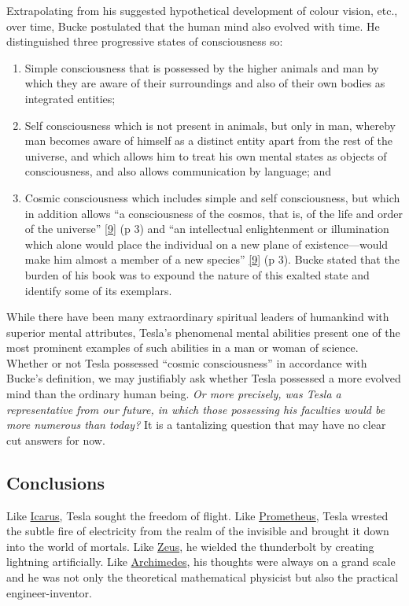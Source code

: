 \documentclass[
  a4paper,
]{article}
\begin{document}
Extrapolating from his suggested hypothetical development of colour
vision, etc., over time, Bucke postulated that the human mind also
evolved with time. He distinguished three progressive states of
consciousness so:

\begin{enumerate}
\item
  Simple consciousness that is possessed by the higher animals and man
  by which they are aware of their surroundings and also of their own
  bodies as integrated entities;
\item
  Self consciousness which is not present in animals, but only in man,
  whereby man becomes aware of himself as a distinct entity apart from
  the rest of the universe, and which allows him to treat his own mental
  states as objects of consciousness, and also allows communication by
  language; and
\item
  Cosmic consciousness which includes simple and self consciousness, but
  which in addition allows ``a consciousness of the cosmos, that is, of
  the life and order of the universe''
  \protect\hyperlink{ref-bucke48}{{[}9{]}} (p 3) and ``an intellectual
  enlightenment or illumination which alone would place the individual
  on a new plane of existence---would make him almost a member of a new
  species'' \protect\hyperlink{ref-bucke48}{{[}9{]}} (p 3). Bucke stated
  that the burden of his book was to expound the nature of this exalted
  state and identify some of its exemplars.
\end{enumerate}

While there have been many extraordinary spiritual leaders of humankind
with superior mental attributes, Tesla's phenomenal mental abilities
present one of the most prominent examples of such abilities in a man or
woman of science. Whether or not Tesla possessed ``cosmic
consciousness'' in accordance with Bucke's definition, we may
justifiably ask whether Tesla possessed a more evolved mind than the
ordinary human being. \emph{Or more precisely, was Tesla a
representative from our future, in which those possessing his faculties
would be more numerous than today?} It is a tantalizing question that
may have no clear cut answers for now.

\hypertarget{conclusions}{%
\subsection{Conclusions}\label{conclusions}}

Like \href{https://en.wikipedia.org/wiki/Icarus}{Icarus}, Tesla sought
the freedom of flight. Like
\href{https://en.wikipedia.org/wiki/Prometheus}{Prometheus}, Tesla
wrested the subtle fire of electricity from the realm of the invisible
and brought it down into the world of mortals. Like
\href{https://en.wikipedia.org/wiki/Zeus}{Zeus}, he wielded the
thunderbolt by creating lightning artificially. Like
\href{https://en.wikipedia.org/wiki/Archimedes}{Archimedes}, his
thoughts were always on a grand scale and he was not only the
theoretical mathematical physicist but also the practical
engineer-inventor.
\end{document}
